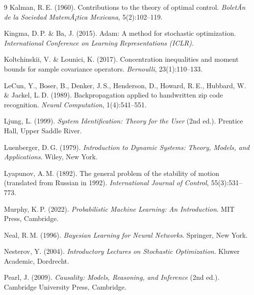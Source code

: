 ﻿\documentclass[12pt, a4paper]{article}
\theoremstyle{definition}
\theoremstyle{remark}
\begin{document}
\begin{thebibliography}{9}
Kalman, R.\,E. (1960).
\newblock Contributions to the theory of optimal control.
\newblock \textit{BoletÃ­n de la Sociedad MatemÃ¡tica Mexicana}, 5(2):102--119.

Kingma, D.\,P. \& Ba, J. (2015).
\newblock Adam: A method for stochastic optimization.
\newblock \textit{International Conference on Learning Representations (ICLR)}.

Koltchinskii, V. \& Lounici, K. (2017).
\newblock Concentration inequalities and moment bounds for sample covariance
  operators.
\newblock \textit{Bernoulli}, 23(1):110--133.

LeCun, Y., Boser, B., Denker, J.\,S., Henderson, D., Howard, R.\,E.,
  Hubbard, W. \& Jackel, L.\,D. (1989).
\newblock Backpropagation applied to handwritten zip code recognition.
\newblock \textit{Neural Computation}, 1(4):541--551.

Ljung, L. (1999).
\newblock \textit{System Identification: Theory for the User} (2nd ed.).
\newblock Prentice Hall, Upper Saddle River.

Luenberger, D.\,G. (1979).
\newblock \textit{Introduction to Dynamic Systems: Theory, Models, and
  Applications}.
\newblock Wiley, New York.

Lyapunov, A.\,M. (1892).
\newblock The general problem of the stability of motion (translated from
  Russian in 1992).
\newblock \textit{International Journal of Control}, 55(3):531--773.

Murphy, K.\,P. (2022).
\newblock \textit{Probabilistic Machine Learning: An Introduction}.
\newblock MIT Press, Cambridge.

Neal, R.\,M. (1996).
\newblock \textit{Bayesian Learning for Neural Networks}.
\newblock Springer, New York.

Nesterov, Y. (2004).
\newblock \textit{Introductory Lectures on Stochastic Optimization}.
\newblock Kluwer Academic, Dordrecht.

Pearl, J. (2009).
\newblock \textit{Causality: Models, Reasoning, and Inference} (2nd ed.).
\newblock Cambridge University Press, Cambridge.


\end{thebibliography}
\end{document}
